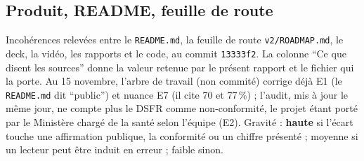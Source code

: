 \begingroup\sloppy
\subsection{Produit, README, feuille de route}\label{pro:inc-e}

Incohérences relevées entre le \texttt{README.md}, la feuille de route \texttt{v2/\allowbreak{}ROADMAP.md}, le deck, la vidéo, les rapports et le code, au commit \texttt{13333f2}.
La colonne \enquote{Ce que disent les sources} donne la valeur retenue par le présent rapport et le fichier qui la porte.
Au 15 novembre, l'arbre de travail (non commité) corrige déjà E1 (le \texttt{README.md} dit \enquote{public}) et nuance E7 (il cite 70 et 77\,\%) ; l'audit, mis à jour le même jour, ne compte plus le DSFR comme non-conformité, le projet étant porté par le Ministère chargé de la santé selon l'équipe (E2).
Gravité : \textbf{haute} si l'écart touche une affirmation publique, la conformité ou un chiffre présenté ; moyenne si un lecteur peut être induit en erreur ; faible sinon.

